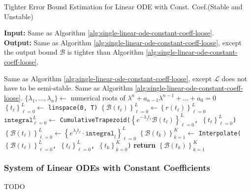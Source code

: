 \documentclass{article}
\newcommand{\Bound}{\mathcal{B}}
\renewcommand{\L}{\mathcal{L}}
\begin{document}
    \begin{algorithm}
        \caption{Tighter Error Bound Estimation for Linear ODE with Const. Coef.\quad  (Stable and Unstable)}\label{alg:single-linear-ode-constant-coeff-tight}
        \textbf{Input:} Same as Algorithm \ref{alg:single-linear-ode-constant-coeff-loose}. \\
        \textbf{Output:} Same as Algorithm \ref{alg:single-linear-ode-constant-coeff-loose}, except the output bound $\Bound$ is tighter than Algorithm \ref{alg:single-linear-ode-constant-coeff-loose}.
        \begin{algorithmic}
            \Require Same as Algorithm \ref{alg:single-linear-ode-constant-coeff-loose}, except $\L$ does not have to be semi-stable.
            \Ensure Same as Algorithm \ref{alg:single-linear-ode-constant-coeff-loose}. 
            \vspace{0.5em}
            \State $\{\lambda_1, \dots, \lambda_n\} \gets$ numerical roots of $\lambda^n+a_{n-1}\lambda^{n-1}+\dots+a_0=0$ 
            \State $\left\{t_\ell\right\}_{\ell=0}^{L} \gets$ \texttt{linspace(0, T)} 
            \State $\left\{\Bound(t_\ell)\right\}_{\ell=0}^{L} \gets \left\{r(t_\ell)\right\}_{\ell=0}^{L}$
                \State $\texttt{integral}_{\ell=0}^{L} \gets$ \texttt{CumulativeTrapezoid($\left\{e^{-\lambda_j t_{\ell}} \Bound(t_\ell)\right\}_{\ell=0}^{L}$, $\left\{t_\ell\right\}_{\ell=0}^{L}$)} \Comment{Approximation of $\int_{0}^{t} e^{-\lambda_j \tau} \Bound(\tau) \mathrm{d} \tau$}
                \State $\displaystyle \left\{\Bound(t_\ell)\right\}_{\ell=0}^{L} \gets \left\{e^{\lambda_j t_{\ell}}\cdot \texttt{integral}_l \right\}_{\ell=0}^{L}$ 
            \EndFor
            \State $\left\{\Bound(t_k)\right\}_{k=1}^{K} \gets $ \texttt{Interpolate($\left\{\Bound(t_\ell)\right\}_{\ell=0}^{L}$, $\left\{t_\ell\right\}_{\ell=0}^{L}$, $\left\{t_k\right\}_{k=0}^{K}$)} 
            \State \textbf{return} $\left\{\Bound(t_k)\right\}_{k=1}^{K}$ 
        \end{algorithmic}
    \end{algorithm}

\subsubsection{System of Linear ODEs with Constant Coefficients} \label{section:system-of-linear-odes-with-constant-coefficients}
    TODO
\end{document}
